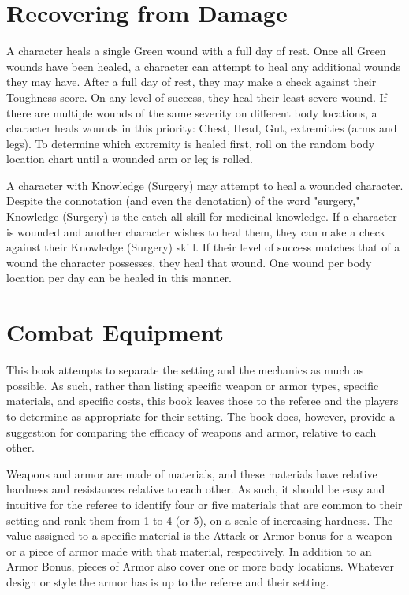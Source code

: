 \documentclass[oneside]{book}
\begin{document}
\begin{multicols}{2}
\section{Recovering from Damage}
A character heals a single Green wound with a full day of rest. Once all Green wounds have been healed, a character can attempt to heal any additional wounds they may have. After a full day of rest, they may make a check against their Toughness score. On any level of success, they heal their least-severe wound. If there are multiple wounds of the same severity on different body locations, a character heals wounds in this priority: Chest, Head, Gut, extremities (arms and legs). To determine which extremity is healed first, roll on the random body location chart until a wounded arm or leg is rolled. 

A character with Knowledge (Surgery) may attempt to heal a wounded character. Despite the connotation (and even the denotation) of the word "surgery," Knowledge (Surgery) is the catch-all skill for medicinal knowledge. If a character is wounded and another character wishes to heal them, they can make a check against their Knowledge (Surgery) skill. If their level of success matches that of a wound the character possesses, they heal that wound. One wound per body location per day can be healed in this manner. 

\section{Combat Equipment}
This book attempts to separate the setting and the mechanics as much as possible. As such, rather than listing specific weapon or armor types, specific materials, and specific costs, this book leaves those to the referee and the players to determine as appropriate for their setting. The book does, however, provide a suggestion for comparing the efficacy of weapons and armor, relative to each other. 

Weapons and armor are made of materials, and these materials have relative hardness and resistances relative to each other. As such, it should be easy and intuitive for the referee to identify four or five materials that are common to their setting and rank them from 1 to 4 (or 5), on a scale of increasing hardness. The value assigned to a specific material is the Attack or Armor bonus for a weapon or a piece of armor made with that material, respectively. In addition to an Armor Bonus, pieces of Armor also cover one or more body locations. Whatever design or style the armor has is up to the referee and their setting. 


\end{multicols}
\end{document}
